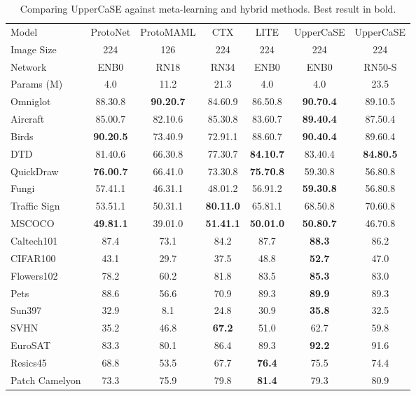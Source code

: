 \documentclass{article}
\begin{document}
\begin{table}[H]
\caption{Comparing UpperCaSE against meta-learning and hybrid methods. Best result in bold.}
\vskip 0.15in
\begin{center}
\begin{small}
\begin{tabular}{lcccccc}
\toprule
Model & ProtoNet & ProtoMAML & CTX & LITE & UpperCaSE & UpperCaSE \\
Image Size & 224 & 126 & 224 & 224 & 224 & 224\\
Network & ENB0 & RN18 & RN34 & ENB0 & ENB0 & RN50-S \\
Params (M) & 4.0 & 11.2 & 21.3 & 4.0 & 4.0 & 23.5 \\
\midrule
Omniglot & 88.30.8 & \textbf{90.20.7} & 84.60.9 & 86.50.8 & \textbf{90.70.4} & 89.10.5\\
Aircraft & 85.00.7 & 82.10.6 & 85.30.8 & 83.60.7 & \textbf{89.40.4} & 87.50.4\\
Birds & \textbf{90.20.5} & 73.40.9 & 72.91.1 & 88.60.7 & \textbf{90.40.4} & 89.60.4\\
DTD & 81.40.6 & 66.30.8 & 77.30.7 & \textbf{84.10.7} & 83.40.4 & \textbf{84.80.5}\\
QuickDraw & \textbf{76.00.7} & 66.41.0 & 73.30.8 & \textbf{75.70.8} & 59.30.8 & 56.80.8\\
Fungi & 57.41.1 & 46.31.1 & 48.01.2 & 56.91.2 & \textbf{59.30.8} & 56.80.8\\
Traffic Sign & 53.51.1 & 50.31.1 & \textbf{80.11.0} & 65.81.1 & 68.50.8 & 70.60.8\\
MSCOCO & \textbf{49.81.1} & 39.01.0 & \textbf{51.41.1} & \textbf{50.01.0} & \textbf{50.80.7} & 46.70.8\\
\midrule
Caltech101 & 87.4 & 73.1 & 84.2 & 87.7 & \textbf{88.3} & 86.2\\
CIFAR100 & 43.1 & 29.7 & 37.5 & 48.8 & \textbf{52.7} & 47.0\\
Flowers102 & 78.2 & 60.2 & 81.8 & 83.5 & \textbf{85.3} & 83.0\\
Pets & 88.6 & 56.6 & 70.9 & 89.3 & \textbf{89.9} & 89.3\\
Sun397 & 32.9 & 8.1 & 24.8 & 30.9 & \textbf{35.8} & 32.5\\
SVHN & 35.2 & 46.8 & \textbf{67.2} & 51.0 & 62.7 & 59.8\\
\midrule
EuroSAT & 83.3 & 80.1 & 86.4 & 89.3 & \textbf{92.2} & 91.6\\
Resics45 & 68.8 & 53.5 & 67.7 & \textbf{76.4} & 75.5 & 74.4\\
Patch Camelyon & 73.3 & 75.9 & 79.8 & \textbf{81.4} & 79.3 & 80.9\\

\end{tabular}
\end{small}
\end{center}
\end{table}
\end{document}
